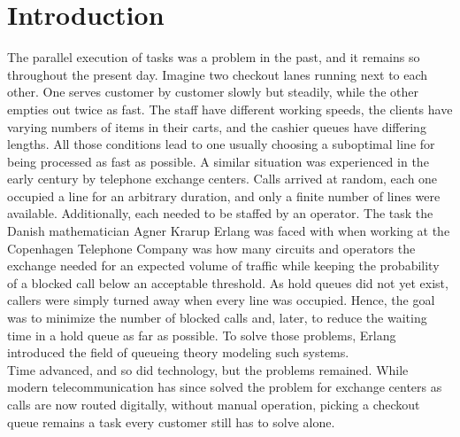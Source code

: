 \chapter{Introduction}
\label{sec:intro}


The parallel execution of tasks was a problem in the past, and it remains so throughout the present day.
Imagine two checkout lanes running next to each other.
One serves customer by customer slowly but steadily, while the other empties out twice as fast.
The staff have different working speeds, the clients have varying numbers of items in their carts, and the cashier queues have differing lengths.
All those conditions lead to one usually choosing a suboptimal line for being processed as fast as possible.
A similar situation was experienced in the early  century by telephone exchange centers.
Calls arrived at random, each one occupied a line for an arbitrary duration, and only a finite number of lines were available.
Additionally, each needed to be staffed by an operator.
The task the Danish mathematician Agner Krarup Erlang was faced with when working at the Copenhagen Telephone Company was how many circuits and operators the exchange needed for an expected volume of traffic while keeping the probability of a blocked call below an acceptable threshold.
As hold queues did not yet exist, callers were simply turned away when every line was occupied.
Hence, the goal was to minimize the number of blocked calls and, later, to reduce the waiting time in a hold queue as far as possible.
To solve those problems, Erlang introduced the field of queueing theory modeling such systems.\\

Time advanced, and so did technology, but the problems remained.
While modern telecommunication has since solved the problem for exchange centers as calls are now routed digitally, without manual operation, picking a checkout queue remains a task every customer still has to solve alone.


